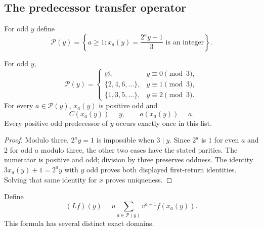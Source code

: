 \subsection{The predecessor transfer operator}

For odd $y$ define
\[
 \mathcal P(y)=\left\{a\geq1:
       x_a(y)=\frac{2^a y-1}{3}\text{ is an integer}\right\}.
\]

\begin{lemma}
\label{lem:weighted-predecessor-fibres}
For odd $y$,
\[
 \mathcal P(y)=
 \begin{cases}
  \varnothing,&y\equiv0\pmod3,\\
  \{2,4,6,\ldots\},&y\equiv1\pmod3,\\
  \{1,3,5,\ldots\},&y\equiv2\pmod3.
 \end{cases}
\]
For every $a\in\mathcal P(y)$, $x_a(y)$ is positive odd and
\[
 C(x_a(y))=y,
 \qquad a(x_a(y))=a.
\]
Every positive odd predecessor of $y$ occurs exactly once in this list.
\end{lemma}

\begin{proof}
Modulo three, $2^a y=1$ is impossible when $3\mid y$.  Since $2^a$ is
$1$ for even $a$ and $2$ for odd $a$ modulo three, the other two cases have
the stated parities.  The numerator is positive and odd; division by three
preserves oddness.  The identity
$3x_a(y)+1=2^ay$ with $y$ odd proves both displayed first-return identities.
Solving that same identity for $x$ proves uniqueness.
\end{proof}

Define
\begin{equation}
\label{eq:weighted-predecessor-transfer}
 (Lf)(y)=u\sum_{a\in\mathcal P(y)}v^{a-1}f(x_a(y)).
\end{equation}
This formula has several distinct exact domains.

